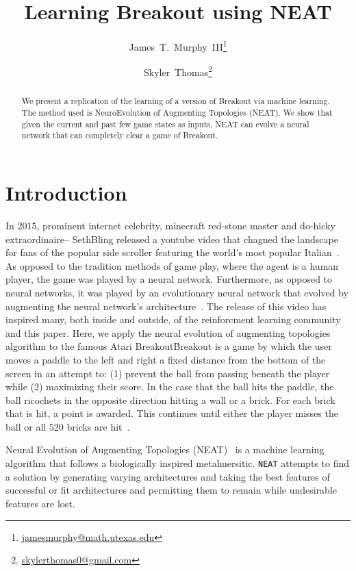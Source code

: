 \documentclass[letterpaper, twocolumn, conference]{article}
\author{James~T.~Murphy~III\thanks{\url{jamesmurphy@math.utexas.edu}}\and{}Skyler~Thomas\thanks{\url{skylerthomas0@gmail.com}}}
\title{Learning Breakout using NEAT}
\begin{document}
\maketitle{}
\begin{abstract}
    We present a replication of the learning of a version of
    Breakout via machine learning.
    The method used is NeuroEvolution of Augmenting Topologies (NEAT).
    We show that given the current and past few game states as inputs, NEAT
    can evolve a neural network that can completely clear a game of Breakout.
\end{abstract}

\section{Introduction}

In 2015, prominent internet celebrity, minecraft red-stone master and do-hicky extraordinaire-- SethBling released a youtube video that chagned the landscape for fans of the popular side scroller featuring the world's most popular Italian~\cite{sethbling2015}. As opposed to the tradition methods of game play, where the agent is a human player, the game was played by a neural network. Furthermore, as opposed to neural networks, it was played by an evolutionary neural network that evolved by augmenting the neural network's architecture~\cite{stanley2002evolving}. The release of this video has inspired many, both inside and outside, of the reinforcment learning community and this paper. Here, we apply the neural evolution of augmenting topologies algorithm to the famous Atari Breakout\.

Breakout is a game by which the user moves a paddle to the left and right a fixed distance from the bottom of the screen in an attempt to:
(1) prevent the ball from passing beneath the player while
(2) maximizing their score.
In the case that the ball hits the paddle, the ball ricochets in the opposite direction hitting a wall or a brick.
For each brick that is hit, a point is awarded.
This continues until either the player misses the ball or all 520 bricks are hit~\cite{wiki:breakout}.

Neural Evolution of Augmenting Topologies (NEAT)~\cite{neatpython} is a machine learning algorithm that follows a biologically inspired metahuersitic. \texttt{NEAT} attempts to find a solution by generating varying architectures and taking the best features of successful or fit architectures and permitting them to remain while undesirable features are lost.
\end{document}
